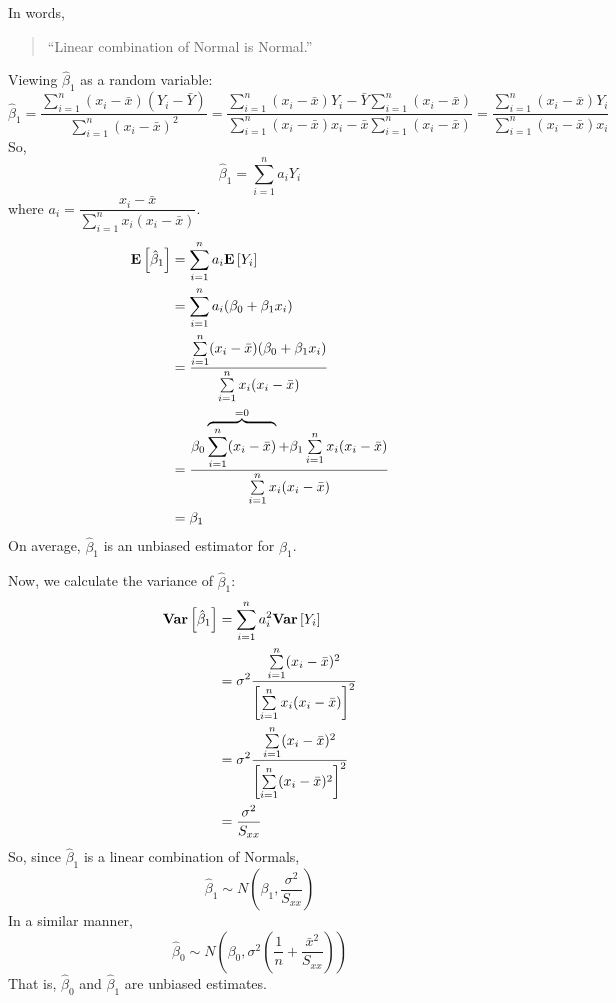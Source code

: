 In words,
\begin{quote}
    ``Linear combination of Normal is Normal.''
\end{quote}
Viewing $ \hat{\beta}_1 $ as a random variable:
\[ \hat{\beta}_1=\frac{\sum\limits_{i=1}^{n} (x_i-\bar{x})
        (Y_i-\bar{Y})}{
        \sum\limits_{i=1}^{n} (x_i-\bar{x})^2
    }
    =
    \frac{\sum\limits_{i=1}^{n} (x_i-\bar{x})Y_i-
        \bar{Y}\sum\limits_{i=1}^{n} (x_i-\bar{x})}{
        \sum\limits_{i=1}^{n} (x_i-\bar{x})x_i-\bar{x}
        \sum\limits_{i=1}^{n} (x_i-\bar{x})
    }
    =
    \frac{\sum\limits_{i=1}^{n} (x_i-\bar{x})Y_i}{
        \sum\limits_{i=1}^{n} (x_i-\bar{x})x_i
    }  \]
So,
\[ \hat{\beta}_1=\sum\limits_{i=1}^{n} a_i Y_i \]
where $ a_i=\dfrac{x_i-\bar{x}}{\sum\limits_{i=1}^{n} x_i(x_i-\bar{x})}  $.
\begin{align*}
    \bm{\mathrm{E}}\left[\hat{\beta}_1\right]
     & = \sum\limits_{i=1}^{n} a_i\bm{\mathrm{E}}\left[Y_i\right]                                  \\
     & =\sum\limits_{i=1}^{n}a_i(\beta_0+\beta_1x_i)                       \\
     & =\frac{\sum\limits_{i=1}^{n}(x_i-\bar{x})(\beta_0+\beta_1x_i)}{
        \sum\limits_{i=1}^{n} x_i(x_i-\bar{x})
    }                                                                      \\
     & =\frac{\beta_0 \overbrace{\sum\limits_{i=1}^{n}(x_i-\bar{x})}^{=0}+
        \beta_1\sum\limits_{i=1}^{n} x_i(x_i-\bar{x})}{
        \sum\limits_{i=1}^{n} x_i(x_i-\bar{x})
    }                                                                      \\
     & =
    \beta_1
\end{align*}
On average, $ \hat{\beta}_1 $ is an unbiased estimator for $ \beta_1 $.

Now, we calculate the variance of $ \hat{\beta}_1 $:
\begin{align*}
    \bm{\mathrm{Var}}\left[\hat{\beta}_1\right]
     & =\sum\limits_{i=1}^{n} a_i^2\bm{\mathrm{Var}}\left[Y_i\right]                   \\
     & =\sigma^2
    \frac{\sum\limits_{i=1}^{n} (x_i-\bar{x})^2}{
        \left[ \sum\limits_{i=1}^{n} x_i(x_i-\bar{x}) \right]^2
    }                                                          \\
     & =\sigma^2 \frac{\sum\limits_{i=1}^{n} (x_i-\bar{x})^2}{
        \left[ \sum\limits_{i=1}^{n} (x_i-\bar{x})^2 \right]^2
    }                                                          \\
     & =\frac{\sigma^2}{S_{xx}}
\end{align*}
So, since $ \hat{\beta}_1 $ is a linear combination of Normals,
\[ \hat{\beta}_1\sim
    N\left( \beta_1,\frac{\sigma^2}{S_{xx}}  \right) \]
In a similar manner,
\[ \hat{\beta}_0
    \sim N\left( \beta_0,\sigma^2
    \left(\frac{1}{n}+\frac{\bar{x}^2}{S_{xx}}\right)  \right) \]
That is, $ \hat{\beta}_0 $ and $ \hat{\beta}_1 $ are
unbiased estimates.

